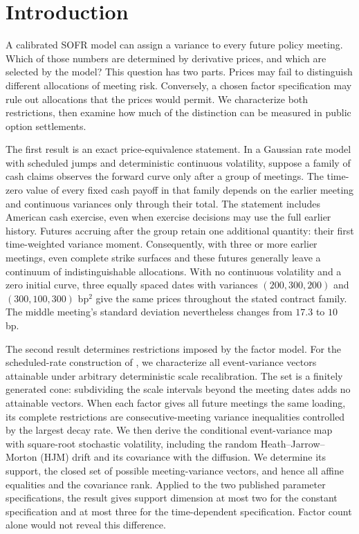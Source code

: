 \section{Introduction}
A calibrated SOFR model can assign a variance to every future policy meeting. Which of those numbers are determined by derivative prices, and which are selected by the model? This question has two parts. Prices may fail to distinguish different allocations of meeting risk. Conversely, a chosen factor specification may rule out allocations that the prices would permit. We characterize both restrictions, then examine how much of the distinction can be measured in public option settlements.

The first result is an exact price-equivalence statement. In a Gaussian rate model with scheduled jumps and deterministic continuous volatility, suppose a family of cash claims observes the forward curve only after a group of meetings. The time-zero value of every fixed cash payoff in that family depends on the earlier meeting and continuous variances only through their total. The statement includes American cash exercise, even when exercise decisions may use the full earlier history. Futures accruing after the group retain one additional quantity: their first time-weighted variance moment. Consequently, with three or more earlier meetings, even complete strike surfaces and these futures generally leave a continuum of indistinguishable allocations. With no continuous volatility and a zero initial curve, three equally spaced dates with variances $(200,300,200)$ and $(300,100,300)$ bp$^2$ give the same prices throughout the stated contract family. The middle meeting's standard deviation nevertheless changes from $17.3$ to $10$ bp.

The second result determines restrictions imposed by the factor model. For the scheduled-rate construction of \citet{brace2024sofr}, we characterize all event-variance vectors attainable under arbitrary deterministic scale recalibration. The set is a finitely generated cone: subdividing the scale intervals beyond the meeting dates adds no attainable vectors. When each factor gives all future meetings the same loading, its complete restrictions are consecutive-meeting variance inequalities controlled by the largest decay rate. We then derive the conditional event-variance map with square-root stochastic volatility, including the random Heath--Jarrow--Morton (HJM) drift and its covariance with the diffusion. We determine its support, the closed set of possible meeting-variance vectors, and hence all affine equalities and the covariance rank. Applied to the two published parameter specifications, the result gives support dimension at most two for the constant specification and at most three for the time-dependent specification. Factor count alone would not reveal this difference.

